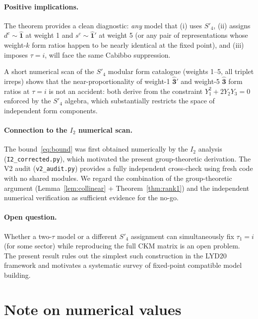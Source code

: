 \documentclass[a4paper,11pt]{article}
\newcommand{\Spf}{S'_4}
\begin{document}
\paragraph{Positive implications.}
The theorem provides a clean diagnostic: \emph{any} model that (i) uses
$\Spf$, (ii) assigns $d^c\sim\hat{\mathbf{1}}$ at weight 1 and
$s^c\sim\hat{\mathbf{1}}'$ at weight 5 (or any pair of representations
whose weight-$k$ form ratios happen to be nearly identical at the
fixed point), and (iii) imposes $\tau=i$, will face the same Cabibbo
suppression.

A short numerical scan of the $\Spf$ modular form catalogue
(weights 1--5, all triplet irreps) shows that the near-proportionality
of weight-1 $\hat{\mathbf{3}}'$ and weight-5 $\hat{\mathbf{3}}$ form
ratios at $\tau=i$ is not an accident: both derive from the constraint
$Y_1^2+2Y_2 Y_3=0$ enforced by the $\Spf$ algebra, which substantially
restricts the space of independent form components.

\paragraph{Connection to the $I_2$ numerical scan.}
The bound~\eqref{eq:bound} was first obtained numerically by the $I_2$
analysis (\texttt{I2\_corrected.py}), which motivated the present
group-theoretic derivation.  The V2 audit (\texttt{v2\_audit.py})
provides a fully independent cross-check using fresh code with no shared
modules.  We regard the combination of the group-theoretic argument
(Lemma~\ref{lem:collinear} + Theorem~\ref{thm:rank1}) and the
independent numerical verification as sufficient evidence for the
no-go.

\paragraph{Open question.}
Whether a two-$\tau$ model or a different $\Spf$ assignment can
simultaneously fix $\tau_1=i$ (for some sector) while reproducing the
full CKM matrix is an open problem.  The present result rules out the
simplest such construction in the LYD20 framework and motivates a
systematic survey of fixed-point compatible model building.

\section*{Note on numerical values}
\end{document}
